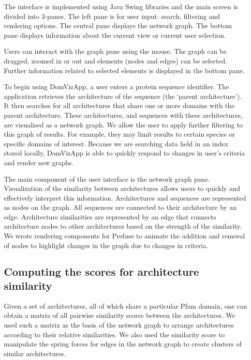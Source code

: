 The interface is implemented using Java Swing libraries and the main screen is divided into 3-panes. The left pane is for user input: search, filtering and rendering options. The central pane displays the network graph. The bottom pane displays information about the current view or current user selection.

Users can interact with the graph pane using the mouse. The graph can be dragged, zoomed in or out and elements (nodes and edges) can be selected. Further information related to selected elements is displayed in the bottom pane.

To begin using DomVizApp, a user enters a protein sequence identifier. The application retrieves the architecture of the sequence (the `parent architecture'). It then searches for all architectures that share one or more domains with the parent architecture. These architectures, and sequences with these architectures, are visualised as a network graph. We allow the user to apply further filtering to this graph of results. For example, they may limit results to certain species or specific domains of interest. Because we are searching data held in an index stored locally, DomVizApp is able to quickly respond to changes in user's criteria and render new graphs.

The main component of the user interface is the network graph pane. Visualization of the similarity between architectures allows users to quickly and effectively interpret this information. Architectures and sequences are represented as nodes on the graph. All sequences are connected to their architecture by an edge. Architecture similarities are represented by an edge that connects architecture nodes to other architectures based on the strength of the similarity. We wrote rendering components for Prefuse to animate the addition and removal of nodes to highlight changes in the graph due to changes in criteria. 


\subsection{Computing the scores for architecture similarity}

Given a set of architectures, all of which share a particular Pfam domain, one can obtain a matrix of all pairwise similarity scores between the architectures. We used such a matrix as the basis of the network graph to arrange architectures according to their relative similarities. We also used the similarity score to manipulate the spring forces for edges in the network graph to create clusters of similar architectures.


